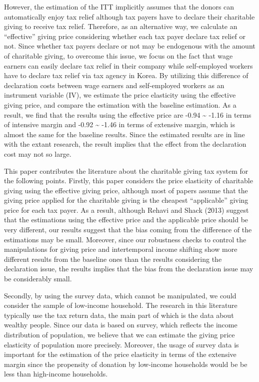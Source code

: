 \documentclass[
  11pt,
  a4paper,
]{article}
\begin{document}
However, the estimation of the ITT implicitly assumes that the donors can automatically enjoy tax relief although tax payers have to declare their charitable giving to receive tax relief. Therefore, as an alternative way, we calculate an ``effective'' giving price considering whether each tax payer declare tax relief or not. Since whether tax payers declare or not may be endogenous with the amount of charitable giving, to overcome this issue, we focus on the fact that wage earners can easily declare tax relief in their company while self-employed workers have to declare tax relief via tax agency in Korea. By utilizing this difference of declaration costs between wage earners and self-employed workers as an instrument variable (IV), we estimate the price elasticity using the effective giving price, and compare the estimation with the baseline estimation. As a result, we find that the results using the effective price are -0.94 \textasciitilde{} -1.16 in terms of intensive margin and -0.92 \textasciitilde{} -1.46 in terms of extensive margin, which is almost the same for the baseline results. Since the estimated results are in line with the extant research, the result implies that the effect from the declaration cost may not so large.

This paper contributes the literature about the charitable giving tax system for the following points. Firstly, this paper considers the price elasticity of charitable giving using the effective giving price, although most of papers assume that the giving price applied for the charitable giving is the cheapest ``applicable'' giving price for each tax payer. As a result, although Rehavi and Shack (2013) suggest that the estimations using the effective price and the applicable price should be very different, our results suggest that the bias coming from the difference of the estimations may be small. Moreover, since our robustness checks to control the manipulations for giving price and intertemporal income shifting show more different results from the baseline ones than the results considering the declaration issue, the results implies that the bias from the declaration issue may be considerably small.

Secondly, by using the survey data, which cannot be manipulated, we could consider the sample of low-income household. The research in this literature typically use the tax return data, the main part of which is the data about wealthy people. Since our data is based on survey, which reflects the income distribution of population, we believe that we can estimate the giving price elasticity of population more precisely. Moreover, the usage of survey data is important for the estimation of the price elasticity in terms of the extensive margin since the propensity of donation by low-income households would be be less than high-income households.
\end{document}
